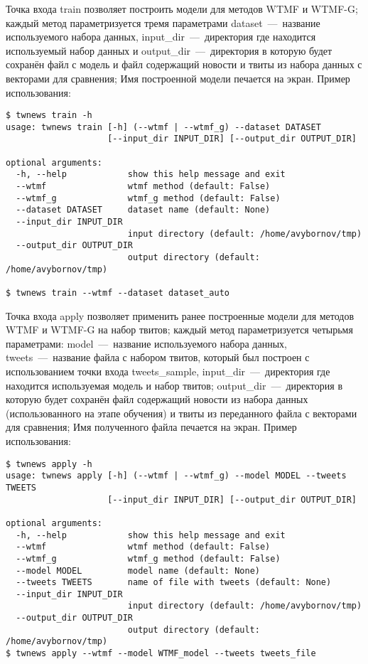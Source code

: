         Точка входа train позволяет построить модели для методов WTMF и WTMF-G; каждый метод параметризуется тремя параметрами
        dataset~---~название используемого набора данных, input\_dir~---~директория где находится используемый набор данных и
        output\_dir~---~директория в которую будет сохранён файл с модель и файл содержащий новости и твиты из набора данных с векторами для сравнения;
        Имя построенной модели печается на экран. Пример использования:
        \begin{lstlisting}
$ twnews train -h
usage: twnews train [-h] (--wtmf | --wtmf_g) --dataset DATASET
                    [--input_dir INPUT_DIR] [--output_dir OUTPUT_DIR]

optional arguments:
  -h, --help            show this help message and exit
  --wtmf                wtmf method (default: False)
  --wtmf_g              wtmf_g method (default: False)
  --dataset DATASET     dataset name (default: None)
  --input_dir INPUT_DIR
                        input directory (default: /home/avybornov/tmp)
  --output_dir OUTPUT_DIR
                        output directory (default: /home/avybornov/tmp)

$ twnews train --wtmf --dataset dataset_auto
        \end{lstlisting}


        Точка входа apply позволяет применить ранее построенные модели для методов WTMF и WTMF-G на набор твитов;
        каждый метод параметризуется четырьмя параметрами: model~---~название используемого набора данных,
        tweets~---~название файла с набором твитов, который был построен с использованием точки входа tweets\_sample,
        input\_dir~---~директория где находится используемая модель и набор твитов;
        output\_dir~---~директория в которую будет сохранён файл содержащий новости из набора данных (использованного на этапе обучения)
        и твиты из переданного файла с векторами для сравнения;
        Имя полученного файла печается на экран. Пример использования:
        \begin{lstlisting}
$ twnews apply -h
usage: twnews apply [-h] (--wtmf | --wtmf_g) --model MODEL --tweets TWEETS
                    [--input_dir INPUT_DIR] [--output_dir OUTPUT_DIR]

optional arguments:
  -h, --help            show this help message and exit
  --wtmf                wtmf method (default: False)
  --wtmf_g              wtmf_g method (default: False)
  --model MODEL         model name (default: None)
  --tweets TWEETS       name of file with tweets (default: None)
  --input_dir INPUT_DIR
                        input directory (default: /home/avybornov/tmp)
  --output_dir OUTPUT_DIR
                        output directory (default: /home/avybornov/tmp)
$ twnews apply --wtmf --model WTMF_model --tweets tweets_file
        \end{lstlisting}

